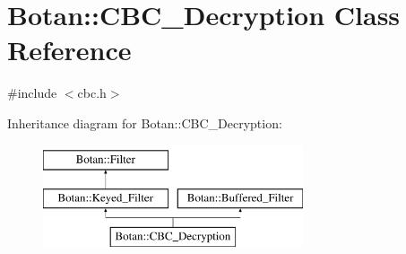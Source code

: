 \hypertarget{classBotan_1_1CBC__Decryption}{\section{Botan\-:\-:C\-B\-C\-\_\-\-Decryption Class Reference}
\label{classBotan_1_1CBC__Decryption}
}


{\ttfamily \#include $<$cbc.\-h$>$}

Inheritance diagram for Botan\-:\-:C\-B\-C\-\_\-\-Decryption\-:\begin{figure}[H]
\begin{center}
\leavevmode
\includegraphics[height=3.000000cm]{classBotan_1_1CBC__Decryption}
\end{center}
\end{figure}
